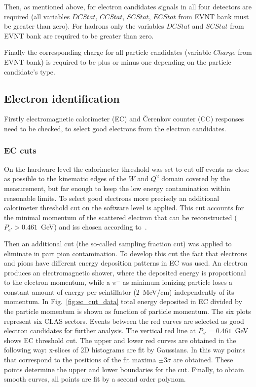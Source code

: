Then, as mentioned above, for electron candidates signals in all four detectors are required (all variables $DCStat$, $CCStat$, $SCStat$, $ECStat$ from EVNT bank must be greater than zero). For hadrons only the variables $DCStat$ and $SCStat$ from EVNT bank are required to be greater than zero. 

Finally the corresponding charge for all particle candidates (variable $Charge$ from EVNT bank) is required to be plus or minus one depending on the particle candidate's type.
 

\subsection{Electron identification}
\label{electron} 

Firstly electromagnetic calorimeter (EC) and \v Cerenkov counter (CC) responses need to be checked, to select good electrons from the electron candidates.

\subsubsection{EC cuts}
\label{ec_cuts}


On the hardware level the calorimeter threshold was set
to cut off events as close as possible to the kinematic edges
of the $W$ and $Q^{2}$ domain covered by the measurement, but far
enough to keep the low energy contamination within reasonable
limits. To select good electrons more precisely an additional calorimeter threshold cut on the software level  is applied. This cut accounts for the minimal momentum of the scattered electron that can be reconstructed ($P_{e'} > 0.461$~GeV) and iss chosen according to~\cite{Egian:007}.

Then an additional cut (the so-called sampling fraction cut) was applied to  eliminate in part pion contamination. To develop this cut the fact that electrons and pions
have different  energy deposition patterns in EC was used. An electron produces an electromagnetic shower, where the
deposited energy is proportional to the electron momentum, while a $\pi^{-}$ as  minimum ionizing particle loses a constant
amount of energy per scintillator (2~MeV/cm) independently of its momentum. In Fig.~\ref{fig:ec_cut_data} total energy deposited in EC divided by the particle momentum is shown as function of particle momentum. The six plots represent six CLAS sectors. Events between the red curves are selected as good electron candidates for further analysis. The vertical red line at $P_{e'} = 0.461$~GeV shows EC threshold cut. The upper and lower red curves are obtained in the following way:  x-slices of 2D histograms are fit by Gaussians. In this way points that correspond to the positions of the fit maxima $\pm 3\sigma$ are obtained. These points determine the upper and lower boundaries for the cut. Finally, to obtain smooth curves, all points are fit by a second order polynom.  

